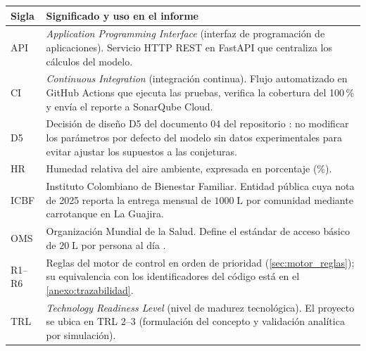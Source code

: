 \begin{tabularx}{\textwidth}{@{}L{2.5cm}Y@{}}
\toprule
\textbf{Sigla} & \textbf{Significado y uso en el informe} \\
\midrule
API & \emph{Application Programming Interface} (interfaz de programaci\'on de aplicaciones). Servicio HTTP REST en FastAPI que centraliza los c\'alculos del modelo. \\
CI & \emph{Continuous Integration} (integraci\'on continua). Flujo automatizado en GitHub Actions que ejecuta las pruebas, verifica la cobertura del 100\,\% y env\'ia el reporte a SonarQube Cloud. \\
D5 & Decisi\'on de dise\~no D5 del documento 04 del repositorio \parencite[doc.~04, \S~1]{axioma2026engine}: no modificar los par\'ametros por defecto del modelo sin datos experimentales para evitar ajustar los supuestos a las conjeturas. \\
HR & Humedad relativa del aire ambiente, expresada en porcentaje (\%). \\
ICBF & Instituto Colombiano de Bienestar Familiar. Entidad p\'ublica cuya nota de 2025 reporta la entrega mensual de $1000\;\text{L}$ por comunidad mediante carrotanque en La Guajira. \\
OMS & Organizaci\'on Mundial de la Salud. Define el est\'andar de acceso b\'asico de $20\;\text{L}$ por persona al d\'ia \parencite{howard2020domestic}. \\
R1--R6 & Reglas del motor de control en orden de prioridad (\cref{sec:motor_reglas}); su equivalencia con los identificadores del c\'odigo est\'a en el \cref{anexo:trazabilidad}. \\
TRL & \emph{Technology Readiness Level} (nivel de madurez tecnol\'ogica). El proyecto se ubica en TRL 2--3 (formulaci\'on del concepto y validaci\'on anal\'itica por simulaci\'on). \\
\bottomrule
\end{tabularx}
